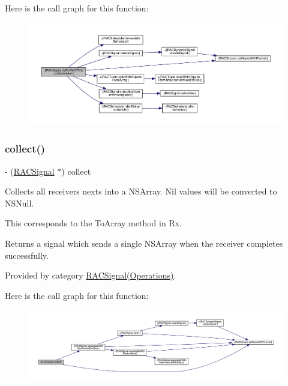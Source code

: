 Here is the call graph for this function\+:\nopagebreak
\begin{figure}[H]
\begin{center}
\leavevmode
\includegraphics[width=350pt]{interface_r_a_c_signal_a7f0cb2086a2123f40552d2eab2a9cc54_cgraph}
\end{center}
\end{figure}
\mbox{\label{interface_r_a_c_signal_a70b8f976dc0ece9b82e47cdb346a3a09}} 
\subsubsection{\texorpdfstring{collect()}{collect()}\hspace{0.1cm}{\footnotesize\ttfamily [1/3]}}
{\footnotesize\ttfamily -\/ (\mbox{\hyperlink{interface_r_a_c_signal}{R\+A\+C\+Signal}} $\ast$) collect \begin{DoxyParamCaption}{ }\end{DoxyParamCaption}}

Collects all receiver\textquotesingle{}s {\ttfamily next}s into a N\+S\+Array. Nil values will be converted to N\+S\+Null.

This corresponds to the {\ttfamily To\+Array} method in Rx.

Returns a signal which sends a single N\+S\+Array when the receiver completes successfully. 

Provided by category \mbox{\hyperlink{category_r_a_c_signal_07_operations_08_a70b8f976dc0ece9b82e47cdb346a3a09}{R\+A\+C\+Signal(\+Operations)}}.

Here is the call graph for this function\+:\nopagebreak
\begin{figure}[H]
\begin{center}
\leavevmode
\includegraphics[width=350pt]{interface_r_a_c_signal_a70b8f976dc0ece9b82e47cdb346a3a09_cgraph}
\end{center}
\end{figure}
\mbox{\label{interface_r_a_c_signal_a70b8f976dc0ece9b82e47cdb346a3a09}} 
